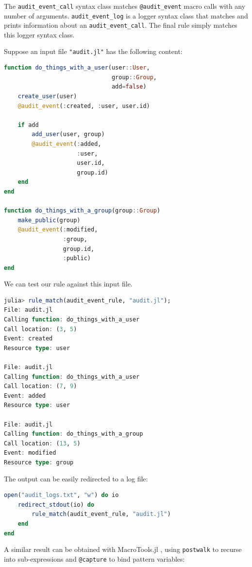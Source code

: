 \documentclass{juliacon}
\begin{document}
The \texttt{audit\_event\_call} syntax class matches \texttt{@audit\_event} macro calls
with any number of arguments. \texttt{audit\_event\_log} is a logger syntax
class that matches and prints information about an
\texttt{audit\_event\_call}. The final rule simply matches this logger syntax
class.

Suppose an input file \texttt{"audit.jl"} has the following content:

\begin{lstlisting}[language=julia]
function do_things_with_a_user(user::User,
                               group::Group,
                               add=false)
    create_user(user)
    @audit_event(:created, :user, user.id)

    if add
        add_user(user, group)
        @audit_event(:added,
                     :user,
                     user.id,
                     group.id)
    end
end

function do_things_with_a_group(group::Group)
    make_public(group)
    @audit_event(:modified,
                 :group,
                 group.id,
                 :public)
end
\end{lstlisting}

We can test our rule against this input file.

\begin{lstlisting}[language=julia]
julia> rule_match(audit_event_rule, "audit.jl");
File: audit.jl
Calling function: do_things_with_a_user
Call location: (3, 5)
Event: created
Resource type: user

File: audit.jl
Calling function: do_things_with_a_user
Call location: (7, 9)
Event: added
Resource type: user

File: audit.jl
Calling function: do_things_with_a_group
Call location: (13, 5)
Event: modified
Resource type: group
\end{lstlisting}

The output can be easily redirected to a log file:

\begin{lstlisting}[language=julia]
open("audit_logs.txt", "w") do io
    redirect_stdout(io) do
        rule_match(audit_event_rule, "audit.jl")
    end
end
\end{lstlisting}

A similar result can be obtained with MacroTools.jl
\cite{macro_tools}, using \texttt{postwalk} to recurse into sub-expressions
and \texttt{@capture} to bind pattern variables:
\end{document}
